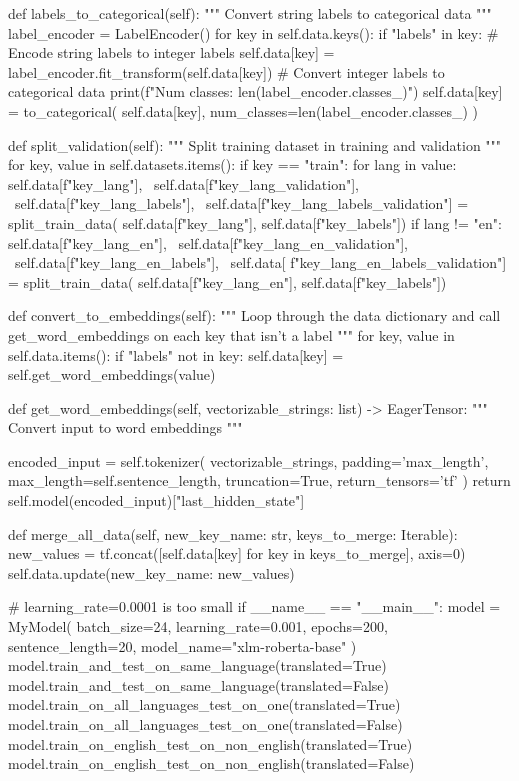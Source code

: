 \begin{python}
  def labels_to_categorical(self):
    """ Convert string labels to categorical data
    """
    label_encoder = LabelEncoder()
    for key in self.data.keys():
      if "labels" in key:
        # Encode string labels to integer labels
        self.data[key] = label_encoder.fit_transform(self.data[key])
        # Convert integer labels to categorical data
        print(f"Num classes: {len(label_encoder.classes_)}")
        self.data[key] = to_categorical(
          self.data[key],
          num_classes=len(label_encoder.classes_)
        )

  def split_validation(self):
    """ Split training dataset in training and validation
    """
    for key, value in self.datasets.items():
      if key == "train":
        for lang in value:
          self.data[f"{key}_{lang}"], \
            self.data[f"{key}_{lang}_validation"], \
            self.data[f"{key}_{lang}_labels"], \
            self.data[f"{key}_{lang}_labels_validation"] = split_train_data(
            self.data[f"{key}_{lang}"],
            self.data[f"{key}_labels"])
          if lang != "en":
            self.data[f"{key}_{lang}_en"], \
              self.data[f"{key}_{lang}_en_validation"], \
              self.data[f"{key}_{lang}_en_labels"], \
              self.data[
                f"{key}_{lang}_en_labels_validation"] = split_train_data(
              self.data[f"{key}_{lang}_en"],
              self.data[f"{key}_labels"])

  def convert_to_embeddings(self):
    """ Loop through the data dictionary and
    call get_word_embeddings on each key that isn't a label
    """
    for key, value in self.data.items():
      if "labels" not in key:
        self.data[key] = self.get_word_embeddings(value)

  def get_word_embeddings(self, vectorizable_strings: list) -> EagerTensor:
    """ Convert input to word embeddings
    """

    encoded_input = self.tokenizer(
      vectorizable_strings,
      padding='max_length',
      max_length=self.sentence_length,
      truncation=True,
      return_tensors='tf'
    )
    return self.model(encoded_input)["last_hidden_state"]

  def merge_all_data(self, new_key_name: str, keys_to_merge: Iterable):
    new_values = tf.concat([self.data[key] for key in keys_to_merge], axis=0)
    self.data.update({new_key_name: new_values})


# learning_rate=0.0001 is too small
if __name__ == "__main__":
  model = MyModel(
    batch_size=24, learning_rate=0.001, epochs=200,
    sentence_length=20, model_name="xlm-roberta-base"
  )
  model.train_and_test_on_same_language(translated=True)
  model.train_and_test_on_same_language(translated=False)
  model.train_on_all_languages_test_on_one(translated=True)
  model.train_on_all_languages_test_on_one(translated=False)
  model.train_on_english_test_on_non_english(translated=True)
  model.train_on_english_test_on_non_english(translated=False)


\end{python}
